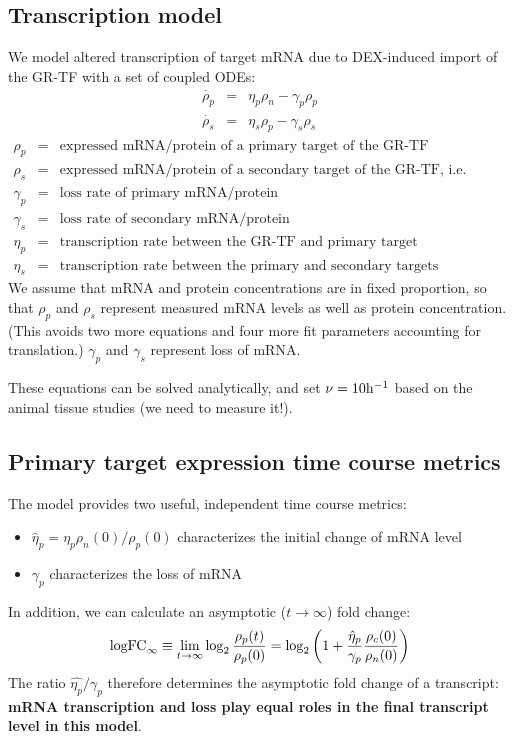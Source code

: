 \documentclass[aspb,landscape]{a0poster}
\begin{document}
\begin{multicols}{3}
  \subsection*{Transcription model}

  We model altered transcription of target mRNA due to DEX-induced import of the GR-TF with a set of coupled ODEs:
  \begin{eqnarray*}
    \dot{\rho_p} &=& \eta_p \rho_n  - \gamma_p \rho_p  \\
    \dot{\rho_s} &=& \eta_s \rho_p  - \gamma_s \rho_s 
  \end{eqnarray*}
  \begin{eqnarray*}
    \rho_p &=& \text{expressed mRNA/protein of a primary target of the GR-TF} \\
    \rho_s &=& \text{expressed mRNA/protein of a secondary target of the GR-TF, i.e. target of a primary target} \\
    \gamma_p &=& \text{loss rate of primary mRNA/protein} \\
    \gamma_s &=& \text{loss rate of secondary mRNA/protein} \\
    \eta_p &=& \text{transcription rate between the GR-TF and primary target} \\
    \eta_s &=& \text{transcription rate between the primary and secondary targets}
  \end{eqnarray*}
  We assume that mRNA and protein concentrations are in fixed proportion, so that $\rho_p$ and $\rho_s$ represent measured mRNA levels as well as protein concentration.
  (This avoids two more equations and four more fit parameters accounting for translation.)
  $\gamma_p$ and  $\gamma_s$ represent loss of mRNA.

  These equations can be solved analytically, and set $\nu=10 {\rm h}^{-1}$ based on the animal tissue studies (we need to measure it!).
  
  \subsection*{Primary target expression time course metrics}

  The model provides two useful, independent time course  metrics:
  \begin{itemize}
    \item $\hat{\eta}_p  = \eta_p \rho_n(0) / \rho_p(0)$ characterizes the initial change of mRNA level
    \item $\gamma_p$ characterizes the loss of mRNA
  \end{itemize}
  In addition, we can calculate an asymptotic ($t\rightarrow\infty$) fold change:
  \begin{equation*}
    {\rm logFC}_\infty \equiv \lim_{t \to \infty} \log_2\frac{\rho_p(t)}{\rho_p(0)} = \log_2\left(1 + \frac{\hat{\eta}_p}{\gamma_p} \frac{\rho_c(0)}{\rho_n(0)} \right)
  \end{equation*}
  The ratio $\hat{\eta_p}/\gamma_p$ therefore determines the asymptotic fold change of a transcript: \textbf{mRNA transcription and loss play equal roles in the final transcript level in this model}.


\end{multicols}
\end{document}
